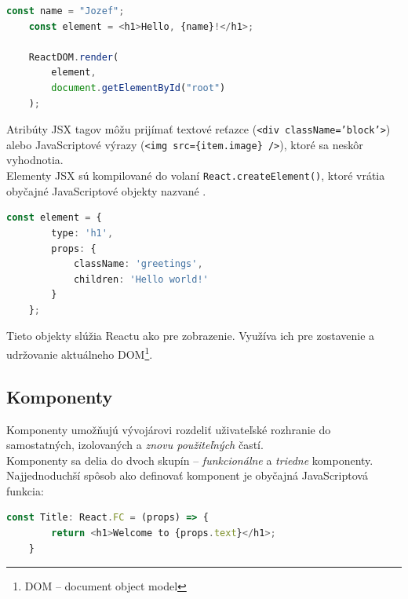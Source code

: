 \begin{lstlisting}[language=TypeScript, caption=Príklad využitia JSX v~React aplikácii. \cite{React}]
	const name = "Jozef";
	const element = <h1>Hello, {name}!</h1>;

	ReactDOM.render(
		element,
		document.getElementById("root")
	);
\end{lstlisting}

\medskip

\noindent Atribúty JSX tagov môžu prijímať textové reťazce (\texttt{<div className='block'>}) alebo JavaScriptové výrazy (\texttt{<img src=\{item.image\} />}), ktoré sa neskôr vyhodnotia. \\

\noindent Elementy JSX sú kompilované do volaní \texttt{React.createElement()}, ktoré vrátia obyčajné JavaScriptové objekty nazvané . \cite{React} \\

\begin{lstlisting}[language=TypeScript, caption=Príklad jednoduchého React elementu po kompilácií. \cite{React}]
	const element = {
		type: 'h1',
		props: {
			className: 'greetings',
			children: 'Hello world!'
		}
	};
\end{lstlisting}

\medskip

\noindent Tieto objekty slúžia Reactu ako  pre zobrazenie. Využíva ich pre zostavenie a udržovanie aktuálneho DOM\footnote{DOM -- document object model}. \cite{React}

\subsection{Komponenty}
\label{theory:components}
Komponenty umožňujú vývojárovi rozdeliť uživateľské rozhranie do samostatných, izolovaných a \emph{znovu použiteľných} častí. \cite{React} \\

\noindent Komponenty sa delia do dvoch skupín -- \emph{funkcionálne} a \emph{triedne} komponenty. Najjednoduchší spôsob ako definovať komponent je obyčajná JavaScriptová funkcia: \\

\begin{lstlisting}[language=TypeScript, caption=Príklad definície funkcionálneho komponentu.]
	const Title: React.FC = (props) => {
		return <h1>Welcome to {props.text}</h1>;
	}
\end{lstlisting}

